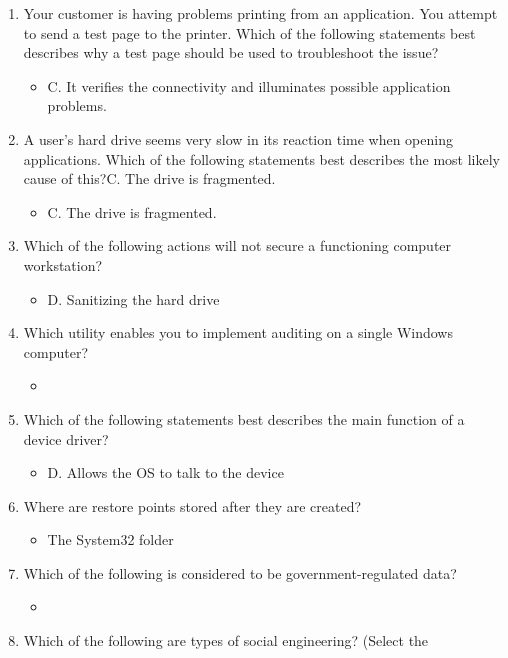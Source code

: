 \documentclass{article}
\begin{document}
\begin{enumerate}
\begin{itemize}
    \end{itemize}
    \item Your customer is having problems printing from an application.
You attempt to send a test page to the printer. Which of the following
statements best describes why a test page should be used to
troubleshoot the issue?
    \begin{itemize}
        \item C. It verifies the connectivity and illuminates possible
application problems.
    \end{itemize}
    \item A user’s hard drive seems very slow in its reaction time when
opening applications. Which of the following statements best
describes the most likely cause of this?C. The drive is fragmented.
    \begin{itemize}
        \item C. The drive is fragmented.
    \end{itemize}
    \item Which of the following actions will not secure a functioning computer
workstation?
    \begin{itemize}
        \item D. Sanitizing the hard drive
    \end{itemize}
    \item Which utility enables you to implement auditing on a single
Windows computer?
    \begin{itemize}
        \item 
    \end{itemize}
    \item Which of the following statements best describes the main function
of a device driver?
    \begin{itemize}
        \item D. Allows the OS to talk to the device
    \end{itemize}
    \item Where are restore points stored after they are created?
    \begin{itemize}
        \item The System32 folder
    \end{itemize}
    \item Which of the following is considered to be government-regulated
data?
    \begin{itemize}
        \item 
    \end{itemize}
    \item Which of the following are types of social engineering? (Select the

\end{enumerate}
\end{document}

